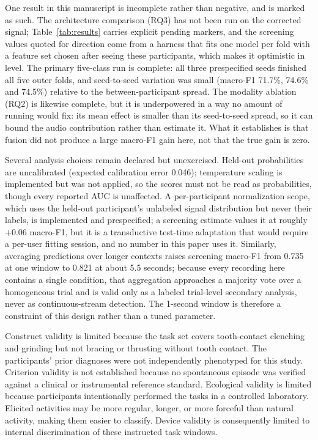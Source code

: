 \documentclass[pdflatex,sn-nature,iicol]{sn-jnl}
\begin{document}
One result in this manuscript is incomplete rather than negative, and is marked as such. The architecture comparison (RQ3) has not been run on the corrected signal; Table~\ref{tab:results} carries explicit pending markers, and the screening values quoted for direction come from a harness that fits one model per fold with a feature set chosen after seeing these participants, which makes it optimistic in level. The primary five-class run is complete: all three prespecified seeds finished all five outer folds, and seed-to-seed variation was small (macro-F1 71.7\%, 74.6\% and 74.5\%) relative to the between-participant spread. The modality ablation (RQ2) is likewise complete, but it is underpowered in a way no amount of running would fix: its mean effect is smaller than its seed-to-seed spread, so it can bound the audio contribution rather than estimate it. What it establishes is that fusion did not produce a large macro-F1 gain here, not that the true gain is zero.

Several analysis choices remain declared but unexercised. Held-out probabilities are uncalibrated (expected calibration error 0.046); temperature scaling is implemented but was not applied, so the scores must not be read as probabilities, though every reported AUC is unaffected. A per-participant normalization scope, which uses the held-out participant's unlabeled signal distribution but never their labels, is implemented and prespecified; a screening estimate values it at roughly $+0.06$ macro-F1, but it is a transductive test-time adaptation that would require a per-user fitting session, and no number in this paper uses it. Similarly, averaging predictions over longer contexts raises screening macro-F1 from 0.735 at one window to 0.821 at about 5.5 seconds; because every recording here contains a single condition, that aggregation approaches a majority vote over a homogeneous trial and is valid only as a labeled trial-level secondary analysis, never as continuous-stream detection. The 1-second window is therefore a constraint of this design rather than a tuned parameter.

Construct validity is limited because the task set covers tooth-contact clenching and grinding but not bracing or thrusting without tooth contact. The participants' prior diagnoses were not independently phenotyped for this study. Criterion validity is not established because no spontaneous episode was verified against a clinical or instrumental reference standard. Ecological validity is limited because participants intentionally performed the tasks in a controlled laboratory. Elicited activities may be more regular, longer, or more forceful than natural activity, making them easier to classify. Device validity is consequently limited to internal discrimination of these instructed task windows.
\end{document}
